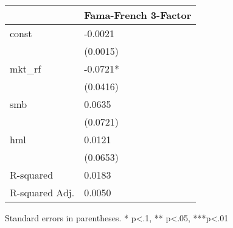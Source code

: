 \begin{table}
\caption{}
\label{}
\begin{center}
\begin{tabular}{ll}
\hline
               & Fama-French 3-Factor  \\
\hline
const          & -0.0021               \\
               & (0.0015)              \\
mkt\_rf        & -0.0721*              \\
               & (0.0416)              \\
smb            & 0.0635                \\
               & (0.0721)              \\
hml            & 0.0121                \\
               & (0.0653)              \\
R-squared      & 0.0183                \\
R-squared Adj. & 0.0050                \\
\hline
\end{tabular}
\end{center}
\end{table}
\bigskip
Standard errors in parentheses. \newline 
* p<.1, ** p<.05, ***p<.01